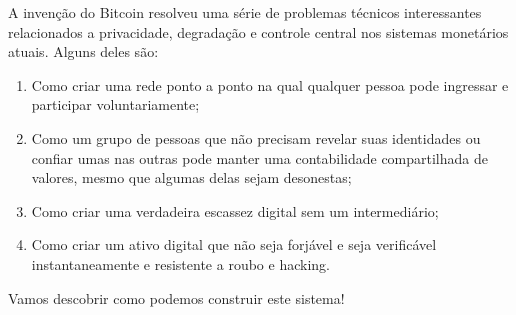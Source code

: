 A invenção do Bitcoin resolveu uma série de problemas técnicos interessantes relacionados a privacidade, degradação e controle central nos sistemas monetários atuais. Alguns deles são:

\begin{enumerate}
\item Como criar uma rede ponto a ponto na qual qualquer pessoa pode ingressar e participar voluntariamente;
\item Como um grupo de pessoas que não precisam revelar suas identidades ou confiar umas nas outras pode manter uma contabilidade compartilhada de valores, mesmo que algumas delas sejam desonestas;
\item Como criar uma verdadeira escassez digital sem um intermediário;
\item Como criar um ativo digital que não seja forjável e seja verificável instantaneamente e resistente a roubo e hacking.
\end{enumerate}

Vamos descobrir como podemos construir este sistema!
